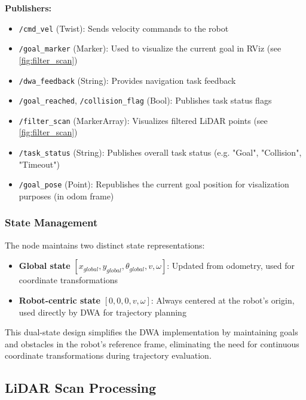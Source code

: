 \textbf{Publishers:}
\begin{itemize}
    \item \texttt{/cmd\_vel} (Twist): Sends velocity commands to the robot
    \item \texttt{/goal\_marker} (Marker): Used to visualize the current goal in RViz (see \autoref{fig:filter_scan})
    \item \texttt{/dwa\_feedback} (String): Provides navigation task feedback
    \item \texttt{/goal\_reached}, \texttt{/collision\_flag} (Bool): Publishes task status flags
    \item \texttt{/filter\_scan} (MarkerArray): Visualizes filtered LiDAR points (see \autoref{fig:filter_scan})
    \item \texttt{/task\_status} (String): Publishes overall task status (e.g. "Goal", "Collision", "Timeout")
    \item \texttt{/goal\_pose} (Point): Republishes the current goal position for visalization purposes (in odom frame)
\end{itemize}


\subsubsection{State Management}
The node maintains two distinct state representations:
\begin{itemize}
    \item \textbf{Global state} $[x_{global}, y_{global}, \theta_{global}, v, \omega]$: Updated from odometry, used for coordinate transformations
    \item \textbf{Robot-centric state} $[0, 0, 0, v, \omega]$: Always centered at the robot's origin, used directly by DWA for trajectory planning
\end{itemize}

This dual-state design simplifies the DWA implementation by maintaining goals and obstacles in the robot's reference frame, eliminating the need for continuous coordinate transformations during trajectory evaluation.

\subsection{LiDAR Scan Processing}

